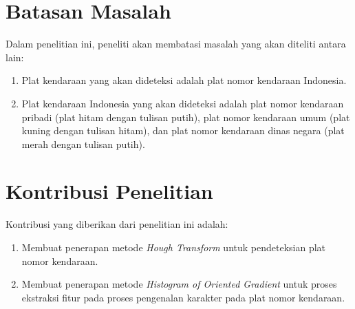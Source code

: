 \section{Batasan Masalah}
\noindent Dalam penelitian ini, peneliti akan membatasi masalah yang akan diteliti antara lain:
\begin{enumerate}[nolistsep,leftmargin=0.5cm]
\item Plat kendaraan yang akan dideteksi adalah plat nomor kendaraan Indonesia.
\item Plat kendaraan Indonesia yang akan dideteksi adalah plat nomor kendaraan pribadi (plat hitam dengan tulisan putih), plat nomor kendaraan umum (plat kuning dengan tulisan hitam), dan plat nomor kendaraan dinas negara (plat merah dengan tulisan putih).\\ 
\end{enumerate}

\section{Kontribusi Penelitian}
\noindent Kontribusi yang diberikan dari penelitian ini adalah:

\begin{enumerate}[nolistsep,leftmargin=0.5cm]
\item Membuat penerapan metode \textit{Hough Transform} untuk pendeteksian plat nomor kendaraan.
\item Membuat penerapan metode \textit{Histogram of Oriented Gradient} untuk proses ekstraksi fitur pada proses pengenalan karakter pada plat nomor kendaraan.\\
\end{enumerate}

